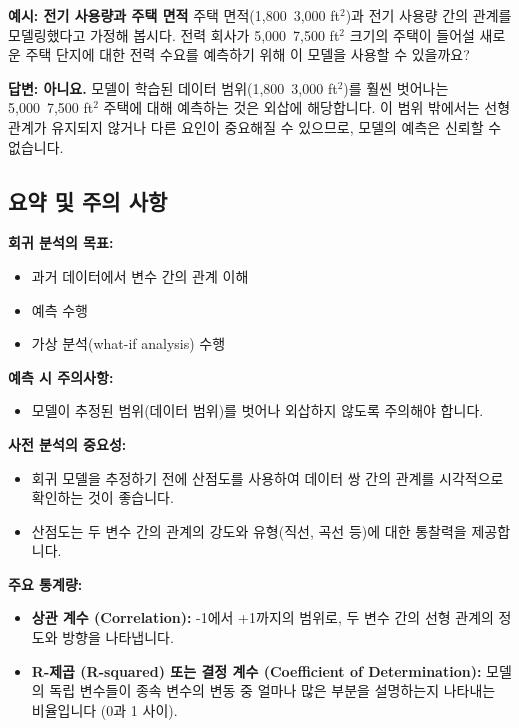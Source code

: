 \documentclass[11pt,a4paper]{article}
\theoremstyle{definition}
\begin{document}
\begin{examplebox}
\textbf{예시: 전기 사용량과 주택 면적}
주택 면적(1,800~3,000 ft$^2$)과 전기 사용량 간의 관계를 모델링했다고 가정해 봅시다. 전력 회사가 5,000~7,500 ft$^2$ 크기의 주택이 들어설 새로운 주택 단지에 대한 전력 수요를 예측하기 위해 이 모델을 사용할 수 있을까요?

\textbf{답변: 아니요.}
모델이 학습된 데이터 범위(1,800~3,000 ft$^2$)를 훨씬 벗어나는 5,000~7,500 ft$^2$ 주택에 대해 예측하는 것은 외삽에 해당합니다. 이 범위 밖에서는 선형 관계가 유지되지 않거나 다른 요인이 중요해질 수 있으므로, 모델의 예측은 신뢰할 수 없습니다.
\end{examplebox}

\subsection{요약 및 주의 사항}
\begin{summarybox}
\textbf{회귀 분석의 목표:}
\begin{itemize}
    \item 과거 데이터에서 변수 간의 관계 이해
    \item 예측 수행
    \item 가상 분석(what-if analysis) 수행
\end{itemize}
\textbf{예측 시 주의사항:}
\begin{itemize}
    \item 모델이 추정된 범위(데이터 범위)를 벗어나 외삽하지 않도록 주의해야 합니다.
\end{itemize}
\textbf{사전 분석의 중요성:}
\begin{itemize}
    \item 회귀 모델을 추정하기 전에 산점도를 사용하여 데이터 쌍 간의 관계를 시각적으로 확인하는 것이 좋습니다.
    \item 산점도는 두 변수 간의 관계의 강도와 유형(직선, 곡선 등)에 대한 통찰력을 제공합니다.
\end{itemize}
\textbf{주요 통계량:}
\begin{itemize}
    \item \textbf{상관 계수 (Correlation):} -1에서 +1까지의 범위로, 두 변수 간의 선형 관계의 정도와 방향을 나타냅니다.
    \item \textbf{R-제곱 (R-squared) 또는 결정 계수 (Coefficient of Determination):} 모델의 독립 변수들이 종속 변수의 변동 중 얼마나 많은 부분을 설명하는지 나타내는 비율입니다 (0과 1 사이).
\end{itemize}
\end{summarybox}
\end{document}
